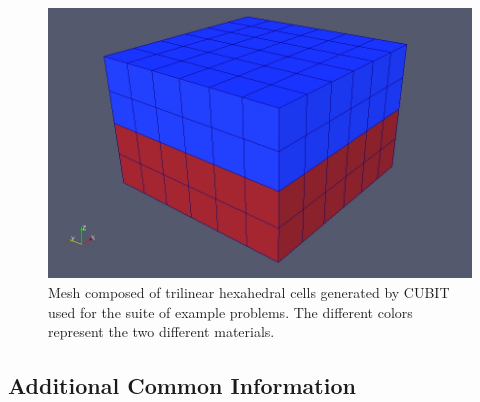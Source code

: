 \noindent \begin{center}
\begin{figure}
\begin{centering}
\includegraphics[scale=0.33]{tutorials/3dhex8/figs/hex8-mesh}
\par\end{centering}

\caption{Mesh composed of trilinear hexahedral cells generated by CUBIT used
for the suite of example problems. The different colors represent
the two different materials.\label{fig:3dhex8-mesh}}
\end{figure}

\par\end{center}


\subsection{Additional Common Information}

